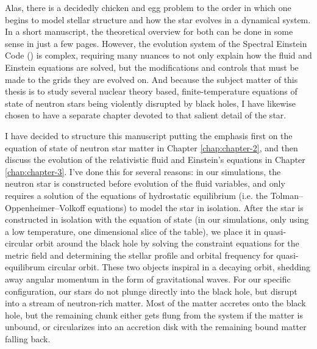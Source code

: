 Alas, there is a decidedly chicken and egg problem to the order in which one begins to model stellar structure and how the star evolves in a dynamical system.
In a short manuscript, the theoretical overview for both can be done in some sense in just a few pages. 
However, the evolution system of the Spectral Einstein Code (\SpEC) is complex, requiring many nuances to not only explain how the fluid and Einstein equations are solved, but the modifications and controls that must be made to the grids they are evolved on.
And because the subject matter of this thesis is to study several nuclear theory based, finite-temperature equations of state of neutron stars being violently disrupted by black holes, I have likewise chosen to have a separate chapter devoted to that salient detail of the star.

I have decided to structure this manuscript putting the emphasis first on the equation of state of neutron star matter in Chapter \ref{chap:chapter-2}, and then discuss the evolution of the relativistic fluid and Einstein's equations in Chapter \ref{chap:chapter-3}.  
I've done this for several reasons: 
in our simulations, the neutron star is constructed before evolution of the fluid variables, and only requires a solution of the equations of hydrostatic equilibrium (i.e. the Tolman–Oppenheimer–Volkoff equations) to model the star in isolation.  
After the star is constructed in isolation with the equation of state (in our simulations, only using a low temperature, one dimensional slice of the table), we place it in quasi-circular orbit around the black hole by solving the constraint equations for the metric field and determining the stellar profile and orbital frequency for quasi-equilibrum circular orbit.
These two objects inspiral in a decaying orbit, shedding away angular momentum in the form of gravitational waves.  
For our specific configuration, our stars do not plunge directly into the black hole, but disrupt into a stream of neutron-rich matter. 
Most of the matter accretes onto the black hole, but the remaining chunk either gets flung from the system if the matter is unbound, or circularizes into an accretion disk with the remaining bound matter falling back.